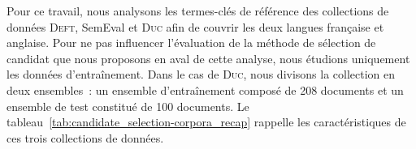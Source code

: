       Pour ce travail, nous analysons les termes-clés de référence des
      collections de données \textsc{Deft}, SemEval et \textsc{Duc} afin de
      couvrir les deux langues française et anglaise. Pour ne pas influencer
      l'évaluation de la méthode de sélection de candidat que nous proposons en
      aval de cette analyse, nous étudions uniquement les données
      d'entraînement. Dans le cas de \textsc{Duc}, nous divisons la collection
      en deux ensembles~: un ensemble d'entraînement composé de 208 documents et
      un ensemble de test constitué de 100 documents. Le
      tableau~\ref{tab:candidate_selection-corpora_recap} rappelle les
      caractéristiques de ces trois collections de données.
      \begin{table}[!h]
        \centering

        \caption{Rappel des corpus utilisés pour analyser les termes-clés de
                 référence
                 \label{tab:candidate_selection-corpora_recap}}
      \end{table}

